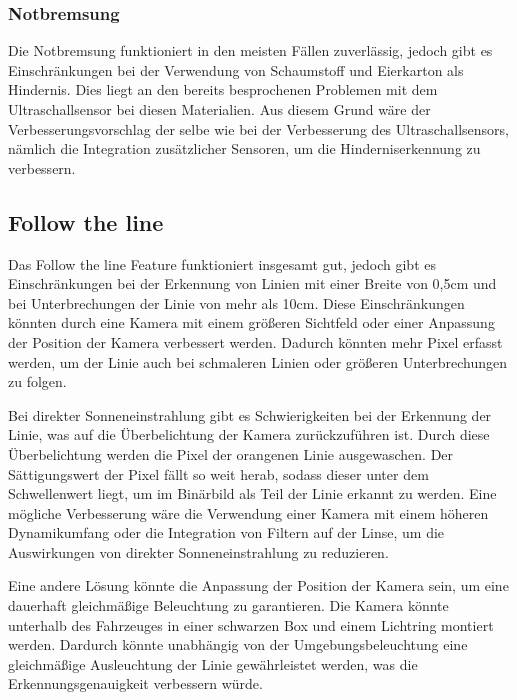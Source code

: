         \subsubsection{Notbremsung}
        Die Notbremsung funktioniert in den meisten Fällen zuverlässig, jedoch gibt es Einschränkungen bei der Verwendung von Schaumstoff und Eierkarton als Hindernis. Dies liegt an den bereits besprochenen Problemen mit dem Ultraschallsensor bei diesen Materialien. Aus diesem Grund wäre der Verbesserungsvorschlag der selbe wie bei der Verbesserung des Ultraschallsensors, nämlich die Integration zusätzlicher Sensoren, um die Hinderniserkennung zu verbessern.

    \subsection{Follow the line}
    Das Follow the line Feature funktioniert insgesamt gut, jedoch gibt es Einschränkungen bei der Erkennung von Linien mit einer Breite von 0,5cm und bei Unterbrechungen der Linie von mehr als 10cm. Diese Einschränkungen könnten durch eine Kamera mit einem größeren Sichtfeld oder einer Anpassung der Position der Kamera verbessert werden. Dadurch könnten mehr Pixel erfasst werden, um der Linie auch bei schmaleren Linien oder größeren Unterbrechungen zu folgen. 

    Bei direkter Sonneneinstrahlung gibt es Schwierigkeiten bei der Erkennung der Linie, was auf die Überbelichtung der Kamera zurückzuführen ist. Durch diese Überbelichtung werden die Pixel der orangenen Linie ausgewaschen. Der Sättigungswert der Pixel fällt so weit herab, sodass dieser unter dem Schwellenwert liegt, um im Binärbild als Teil der Linie erkannt zu werden. Eine mögliche Verbesserung wäre die Verwendung einer Kamera mit einem höheren Dynamikumfang oder die Integration von Filtern auf der Linse, um die Auswirkungen von direkter Sonneneinstrahlung zu reduzieren. 

    Eine andere Lösung könnte die Anpassung der Position der Kamera sein, um eine dauerhaft gleichmäßige Beleuchtung zu garantieren. Die Kamera könnte unterhalb des Fahrzeuges in einer schwarzen Box und einem Lichtring montiert werden. Dardurch könnte unabhängig von der Umgebungsbeleuchtung eine gleichmäßige Ausleuchtung der Linie gewährleistet werden, was die Erkennungsgenauigkeit verbessern würde.


